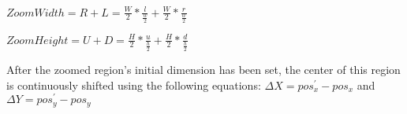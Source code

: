 \vspace{12pt}
$ZoomWidth= R + L = \frac{W}{2}*\frac{l}{\frac{w}{2}} + \frac{W}{2}*\frac{r}{\frac{w}{2}}$

\vspace{12pt}
$ZoomHeight= U + D = \frac{H}{2}*\frac{u}{\frac{h}{2}}+ \frac{H}{2}*\frac{d}{\frac{h}{2}}$
\vspace{12pt}

After the zoomed region's initial dimension has been set, the center of this region is continuously shifted using the following equations: $\Delta X = pos_{x}^{'}-pos_{x}$ and $\Delta Y = pos_{y}^{'}-pos_{y}$

